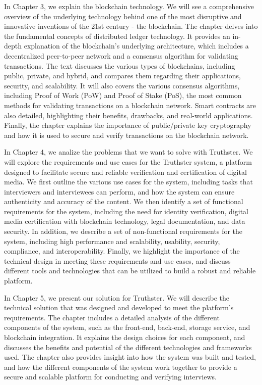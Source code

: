 \documentclass[target=mst,aauheader=]{thud}
\begin{document}
    In Chapter 3, we explain the blockchain technology. We will see a comprehensive overview of the underlying technology behind one of the most disruptive and innovative inventions of the 21st century - the blockchain. The chapter delves into the fundamental concepts of distributed ledger technology. It provides an in-depth explanation of the blockchain's underlying architecture, which includes a decentralized peer-to-peer network and a consensus algorithm for validating transactions. The text discusses the various types of blockchains, including public, private, and hybrid, and compares them regarding their applications, security, and scalability. It will also covers the various consensus algorithms, including Proof of Work (PoW) and Proof of Stake (PoS), the most common methods for validating transactions on a blockchain network. Smart contracts are also detailed, highlighting their benefits, drawbacks, and real-world applications. Finally, the chapter explains the importance of public/private key cryptography and how it is used to secure and verify transactions on the blockchain network.
    
    In Chapter 4, we analize the problems that we want to solve with Truthster. We will explore the requirements and use cases for the Truthster system, a platform designed to facilitate secure and reliable verification and certification of digital media. We first outline the various use cases for the system, including tasks that interviewers and interviewees can perform, and how the system can ensure authenticity and accuracy of the content. We then identify a set of functional requirements for the system, including the need for identity verification, digital media certification with blockchain technology, legal documentation, and data security. In addition, we describe a set of non-functional requirements for the system, including high performance and scalability, usability, security, compliance, and interoperability. Finally, we highlight the importance of the technical design in meeting these requirements and use cases, and discuss different tools and technologies that can be utilized to build a robust and reliable platform.
    
    In Chapter 5, we present our solution for Truthster. We will describe the technical solution that was designed and developed to meet the platform's requirements. The chapter includes a detailed analysis of the different components of the system, such as the front-end, back-end, storage service, and blockchain integration. It explains the design choices for each component, and discusses the benefits and potential of the different technologies and frameworks used. The chapter also provides insight into how the system was built and tested, and how the different components of the system work together to provide a secure and scalable platform for conducting and verifying interviews.
    
\end{document}
